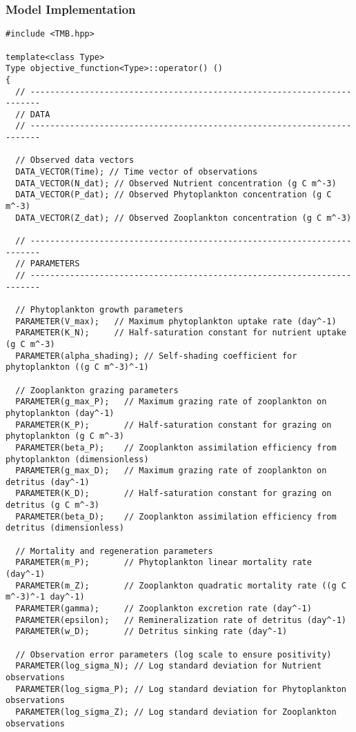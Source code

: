 \subsubsection{Model Implementation}
\begin{lstlisting}
#include <TMB.hpp>

template<class Type>
Type objective_function<Type>::operator() ()
{
  // ------------------------------------------------------------------------
  // DATA
  // ------------------------------------------------------------------------
  
  // Observed data vectors
  DATA_VECTOR(Time); // Time vector of observations
  DATA_VECTOR(N_dat); // Observed Nutrient concentration (g C m^-3)
  DATA_VECTOR(P_dat); // Observed Phytoplankton concentration (g C m^-3)
  DATA_VECTOR(Z_dat); // Observed Zooplankton concentration (g C m^-3)

  // ------------------------------------------------------------------------
  // PARAMETERS
  // ------------------------------------------------------------------------

  // Phytoplankton growth parameters
  PARAMETER(V_max);   // Maximum phytoplankton uptake rate (day^-1)
  PARAMETER(K_N);     // Half-saturation constant for nutrient uptake (g C m^-3)
  PARAMETER(alpha_shading); // Self-shading coefficient for phytoplankton ((g C m^-3)^-1)

  // Zooplankton grazing parameters
  PARAMETER(g_max_P);   // Maximum grazing rate of zooplankton on phytoplankton (day^-1)
  PARAMETER(K_P);       // Half-saturation constant for grazing on phytoplankton (g C m^-3)
  PARAMETER(beta_P);    // Zooplankton assimilation efficiency from phytoplankton (dimensionless)
  PARAMETER(g_max_D);   // Maximum grazing rate of zooplankton on detritus (day^-1)
  PARAMETER(K_D);       // Half-saturation constant for grazing on detritus (g C m^-3)
  PARAMETER(beta_D);    // Zooplankton assimilation efficiency from detritus (dimensionless)

  // Mortality and regeneration parameters
  PARAMETER(m_P);       // Phytoplankton linear mortality rate (day^-1)
  PARAMETER(m_Z);       // Zooplankton quadratic mortality rate ((g C m^-3)^-1 day^-1)
  PARAMETER(gamma);     // Zooplankton excretion rate (day^-1)
  PARAMETER(epsilon);   // Remineralization rate of detritus (day^-1)
  PARAMETER(w_D);       // Detritus sinking rate (day^-1)

  // Observation error parameters (log scale to ensure positivity)
  PARAMETER(log_sigma_N); // Log standard deviation for Nutrient observations
  PARAMETER(log_sigma_P); // Log standard deviation for Phytoplankton observations
  PARAMETER(log_sigma_Z); // Log standard deviation for Zooplankton observations


\end{lstlisting}

